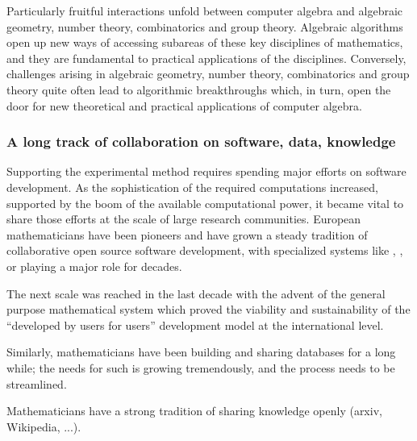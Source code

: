 Particularly fruitful interactions unfold between computer algebra and
algebraic geometry, number theory, combinatorics and group theory. Algebraic algorithms
open up new ways of accessing subareas of these key disciplines of
mathematics, and they are fundamental to practical applications of the
disciplines. Conversely, challenges arising in algebraic geometry, number
theory, combinatorics and group theory quite often lead to algorithmic breakthroughs
which, in turn, open the door for new theoretical and practical applications
of computer algebra.

\subsubsection{A long track of collaboration on software, data, knowledge}

Supporting the experimental method requires spending major efforts
on software development. As the sophistication of the required
computations increased, supported by the boom of the available
computational power, it became vital to share those efforts at the
scale of large research communities. European mathematicians have been
pioneers and have grown a steady tradition of collaborative open
source software development, with specialized systems like \GAP,
\Singular, or \PariGP playing a major role for decades.

The next scale was reached in the last decade with the advent of the
general purpose mathematical system \Sage which proved the viability
and sustainability of the ``developed by users for users'' development
model at the international level.


%
Similarly, mathematicians have been building and sharing databases for
a long while; the needs for such is growing tremendously, and the
process needs to be streamlined.

%
Mathematicians have a strong tradition of sharing knowledge openly
(arxiv, Wikipedia, ...).

